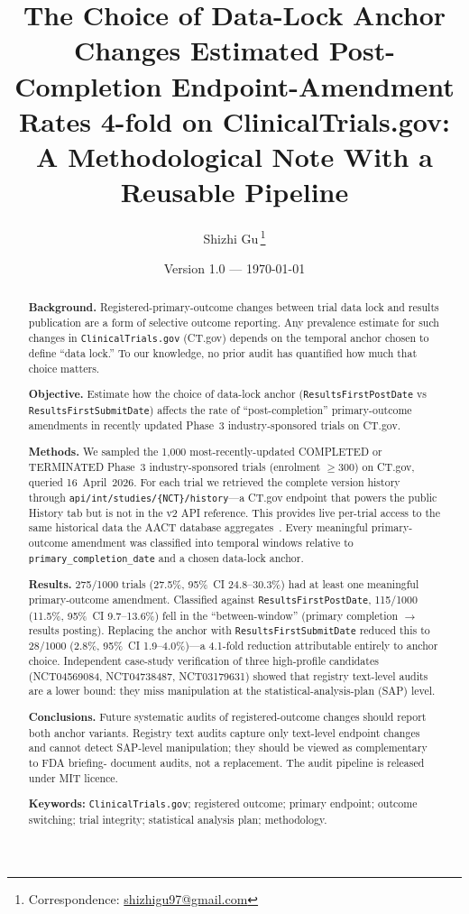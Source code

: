 \documentclass[11pt,a4paper]{article}
\title{\textbf{The Choice of Data-Lock Anchor Changes Estimated
Post-Completion Endpoint-Amendment Rates 4-fold on ClinicalTrials.gov:
A Methodological Note With a Reusable Pipeline}}
\author[1]{Shizhi Gu\,\orcidlink{0009-0009-3036-2268}\thanks{Correspondence:
\href{mailto:shizhigu97@gmail.com}{shizhigu97@gmail.com}}}
\affil[1]{Independent researcher}
\date{Version 1.0 --- \today}
\begin{document}
\maketitle

\begin{abstract}
\noindent
\textbf{Background.} Registered-primary-outcome changes between trial data
lock and results publication are a form of selective outcome reporting.
Any prevalence estimate for such changes in \texttt{ClinicalTrials.gov}
(CT.gov) depends on the temporal anchor chosen to define ``data lock.''
To our knowledge, no prior audit has quantified how much that choice
matters.

\noindent
\textbf{Objective.} Estimate how the choice of data-lock anchor
(\texttt{ResultsFirstPostDate} vs \texttt{ResultsFirstSubmitDate})
affects the rate of ``post-completion'' primary-outcome amendments in
recently updated Phase~3 industry-sponsored trials on CT.gov.

\noindent
\textbf{Methods.} We sampled the 1{,}000 most-recently-updated
COMPLETED or TERMINATED Phase~3 industry-sponsored trials
(enrolment $\geq 300$) on CT.gov, queried 16~April~2026. For each trial
we retrieved the complete version history through
\texttt{api/int/studies/\{NCT\}/history}---a CT.gov endpoint that
powers the public History tab but is not in the v2 API reference. This
provides live per-trial access to the same historical data the AACT
database aggregates~\cite{aact}. Every meaningful primary-outcome
amendment was classified into temporal windows relative to
\texttt{primary\_completion\_date} and a chosen data-lock anchor.

\noindent
\textbf{Results.} 275/1000 trials (27.5\%, 95\%~CI 24.8--30.3\%) had
at least one meaningful primary-outcome amendment. Classified against
\texttt{ResultsFirstPostDate}, 115/1000 (11.5\%, 95\%~CI 9.7--13.6\%)
fell in the ``between-window'' (primary completion $\rightarrow$
results posting). Replacing the anchor with
\texttt{ResultsFirstSubmitDate} reduced this to 28/1000 (2.8\%,
95\%~CI 1.9--4.0\%)---a 4.1-fold reduction attributable entirely to
anchor choice. Independent case-study verification of three
high-profile candidates (NCT04569084, NCT04738487, NCT03179631)
showed that registry text-level audits are a lower bound: they miss
manipulation at the statistical-analysis-plan (SAP) level.

\noindent
\textbf{Conclusions.} Future systematic audits of registered-outcome
changes should report both anchor variants. Registry text audits
capture only text-level endpoint changes and cannot detect SAP-level
manipulation; they should be viewed as complementary to FDA briefing-
document audits, not a replacement. The audit pipeline is released
under MIT licence.

\medskip
\noindent
\textbf{Keywords:} \texttt{ClinicalTrials.gov}; registered outcome;
primary endpoint; outcome switching; trial integrity; statistical
analysis plan; methodology.
\end{abstract}
\end{document}
